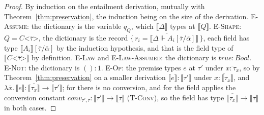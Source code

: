 \begin{proof}
By induction on the entailment derivation, mutually with Theorem~\ref{thm:preservation}, the induction being on the size of the derivation.
\textsc{E-Assume}: the dictionary is the variable $q_Q$, which $\llbracket \Delta \rrbracket$ types at $\llbracket Q \rrbracket$.
\textsc{E-Shape}: $Q = C\texttt{<}\overline{\tau}\texttt{>}$, the dictionary is the record $\{\,\overline{r_i = \llbracket \Delta \Vdash A_i[\overline{\tau}/\overline{\alpha}] \rrbracket}\,\}$, each field has type $\llbracket A_i \rrbracket[\overline{\tau}/\overline{\alpha}]$ by the induction hypothesis, and that is the field type of $\llbracket C\texttt{<}\overline{\tau}\texttt{>} \rrbracket$ by definition.
\textsc{E-Law} and \textsc{E-Law-Assumed}: the dictionary is $\mathit{true} : \mathit{Bool}$.
\textsc{E-Not}: the dictionary is $() : 1$.
\textsc{E-Op}: the premise types $e$ at $\tau'$ under $\overline{x : \tau_x}$, so by Theorem~\ref{thm:preservation} on a smaller derivation $\llbracket e \rrbracket : \llbracket \tau' \rrbracket$ under $\overline{x : \llbracket \tau_x \rrbracket}$, and $\lambda\overline{x}.\,\llbracket e \rrbracket : \overline{\llbracket \tau_x \rrbracket} \to \llbracket \tau' \rrbracket$; for  there is no conversion, and for  the field applies the conversion constant $\mathit{conv}_{\tau',\tau} : \llbracket \tau' \rrbracket \to \llbracket \tau \rrbracket$ (\textsc{T-Conv}), so the field has type $\overline{\llbracket \tau_x \rrbracket} \to \llbracket \tau \rrbracket$ in both cases.
\end{proof}

